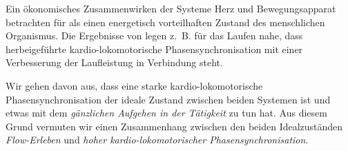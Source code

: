 Ein ökonomisches Zusammenwirken der Systeme Herz und Bewegungsapparat betrachten für \citet[S.~18]{Niizeki2014} als einen energetisch vorteilhaften Zustand des menschlichen Organismus. Die Ergebnisse von \citet{Phillips2013} legen z.~B. für das Laufen nahe, dass herbeigeführte kardio-lokomotorische Phasensynchronisation mit einer Verbesserung der Laufleistung in Verbindung steht.

Wir gehen davon aus, dass eine starke kardio-lokomotorische Phasensynchronisation der ideale Zustand zwischen beiden Systemen ist und etwas mit dem \emph{gänzlichen Aufgehen in der Tätigkeit} zu tun hat. Aus diesem Grund vermuten wir einen Zusammenhang zwischen den beiden Idealzuständen \emph{Flow-Erleben} und \emph{hoher kardio-lokomotorischer Phasensynchronisation}.

